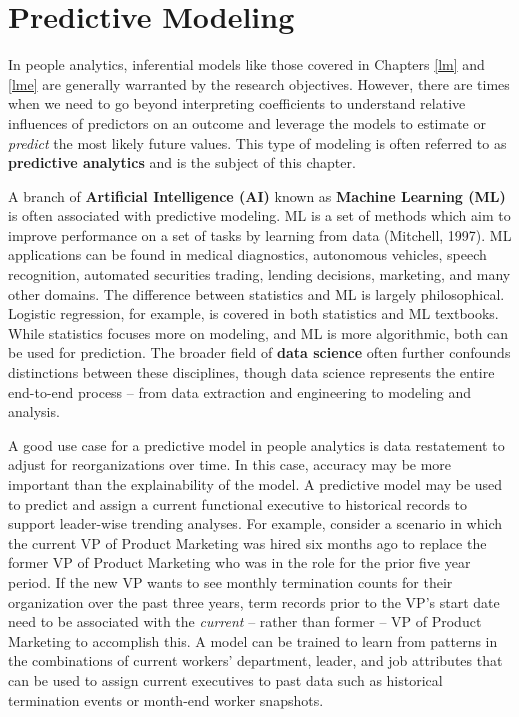 \documentclass[
]{book}
\begin{document}
\hypertarget{pred-mod}{%
\chapter{Predictive Modeling}\label{pred-mod}}

In people analytics, inferential models like those covered in Chapters \ref{lm} and \ref{lme} are generally warranted by the research objectives. However, there are times when we need to go beyond interpreting coefficients to understand relative influences of predictors on an outcome and leverage the models to estimate or \emph{predict} the most likely future values. This type of modeling is often referred to as \textbf{predictive analytics} and is the subject of this chapter.

A branch of \textbf{Artificial Intelligence (AI)} known as \textbf{Machine Learning (ML)} is often associated with predictive modeling. ML is a set of methods which aim to improve performance on a set of tasks by learning from data (Mitchell, 1997). ML applications can be found in medical diagnostics, autonomous vehicles, speech recognition, automated securities trading, lending decisions, marketing, and many other domains. The difference between statistics and ML is largely philosophical. Logistic regression, for example, is covered in both statistics and ML textbooks. While statistics focuses more on modeling, and ML is more algorithmic, both can be used for prediction. The broader field of \textbf{data science} often further confounds distinctions between these disciplines, though data science represents the entire end-to-end process -- from data extraction and engineering to modeling and analysis.

A good use case for a predictive model in people analytics is data restatement to adjust for reorganizations over time. In this case, accuracy may be more important than the explainability of the model. A predictive model may be used to predict and assign a current functional executive to historical records to support leader-wise trending analyses. For example, consider a scenario in which the current VP of Product Marketing was hired six months ago to replace the former VP of Product Marketing who was in the role for the prior five year period. If the new VP wants to see monthly termination counts for their organization over the past three years, term records prior to the VP's start date need to be associated with the \emph{current} -- rather than former -- VP of Product Marketing to accomplish this. A model can be trained to learn from patterns in the combinations of current workers' department, leader, and job attributes that can be used to assign current executives to past data such as historical termination events or month-end worker snapshots.
\end{document}
